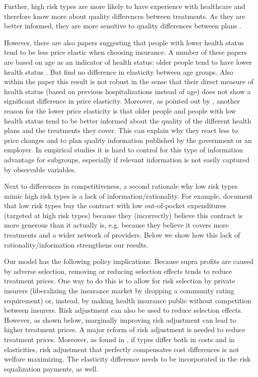 \documentclass[12pt,english,a4paper]{article}
\begin{document}
Further, high risk types are more likely to have experience with healthcare and therefore know more about quality differences between treatments. As they are better informed, they are more sensitive to quality differences between plans \citep{NBERw19800}.

However, there are also papers suggesting that people with lower health status tend to be less price elastic when choosing insurance. A number of these papers are based on age as an indicator of health status: older people tend to have lower health status \citep{STROMBOM200289,Royalty99}. But \cite{Costa_2003} find no difference in elasticity between age groups. Also within the \cite{STROMBOM200289} paper this result is not robust in the sense that their direct measure of health status (based on previous hospitalizations instead of age) does not show a significant difference in price elasticity. Moreover, as pointed out by \cite{BEAULIEU200243}, another reason for the lower price elasticity is that older people and people with low health status tend to be better informed about the quality of the different health plans and the treatments they cover. This can explain why they react less to price changes and to plan quality information published by the government or an employer. In empirical studies it is hard to control for this type of information advantage for subgroups, especially if relevant information is not easily captured by observable variables.

Next to differences in competitiveness, a second rationale why low risk types mimic high risk types is a lack of information/rationality. For example, \cite{handel-2015-healt-insur-human} document that low risk types buy the contract with low out-of-pocket expenditures (targeted at high risk types) because they (incorrectly) believe this contract is more generous than it actually is, e.g. because they believe it covers more treatments and a wider network of providers. Below we show how this lack of rationality/information strengthens our results.

Our model has the following policy implications. Because supra profits are caused by adverse selection, removing or reducing selection effects tends to reduce treatment prices. One way to do this is to allow for risk selection by private insurers (liberalizing the insurance market by dropping a community rating requirement) or, instead, by making health insurance public without competition between insurers. Risk adjustment can also be used to reduce selection effects. However, as shown below, marginally improving risk adjustment can lead to higher treatment prices. A major reform of risk adjustment is needed to reduce treatment prices. Moreover, as found in \cite{bijlsma2014}, if types differ both in costs and in elasticities, risk adjustment that perfectly compensates cost differences is not welfare maximizing. The elasticity difference needs to be incorporated in the risk equalization payments, as well.
\end{document}
